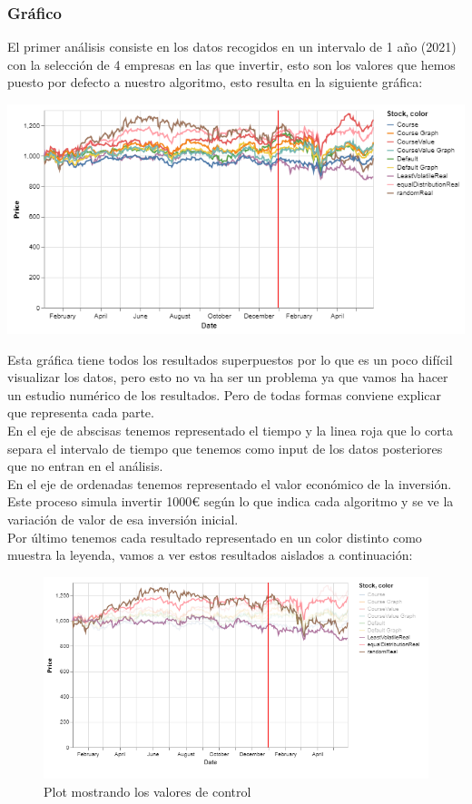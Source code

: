 \documentclass[12pt,a4paper]{article}
\begin{document}
		\subsubsection{Gráfico}
		El primer análisis consiste en los datos recogidos en un intervalo de 1 año (2021) con la selección de 4 empresas en las que invertir, esto son los valores que hemos puesto por defecto a nuestro algoritmo, esto resulta en la siguiente gráfica:\\
		{\includegraphics[scale=1]{results 1 year k=4}\par}
		Esta gráfica tiene todos los resultados superpuestos por lo que es un poco difícil visualizar los datos, pero esto no va ha ser un problema ya que vamos ha hacer un estudio numérico de los resultados. Pero de todas formas conviene explicar que representa cada parte.\\
		En el eje de abscisas tenemos representado el tiempo y la linea roja que lo corta separa el intervalo de tiempo que tenemos como input de los datos posteriores que no entran en el análisis.\\
		En el eje de ordenadas tenemos representado el valor económico de la inversión. Este proceso simula invertir 1000€ según lo que indica cada algoritmo y se ve la variación de valor de esa inversión inicial.\\
		Por último tenemos cada resultado representado en un color distinto como muestra la leyenda, vamos a ver estos resultados aislados a continuación:\\
		\begin{figure}[H]
    		\centering
    		\includegraphics[scale=1]{results 1 year k=4 control}\par
    		\caption{Plot mostrando los valores de control}
		\end{figure}
\end{document}
